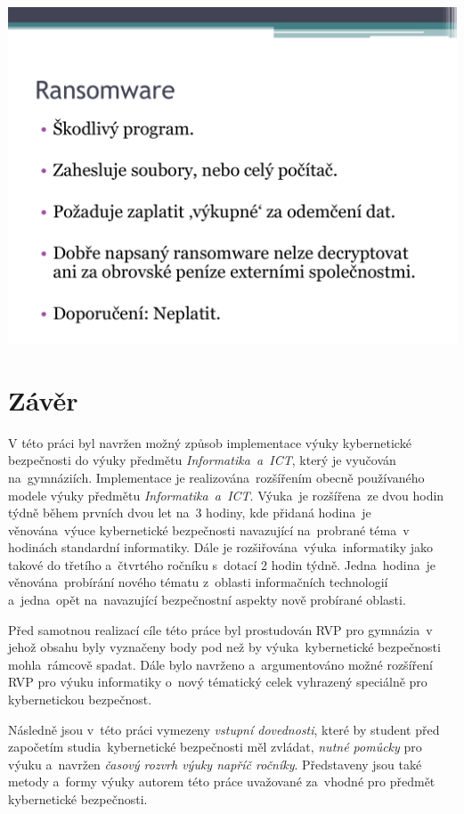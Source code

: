 \documentclass[a4paper, 12pt]{article}
\begin{document}
\vspace{0.5in}
\includegraphics[scale=0.5]{SecurityFlythroughSlides/p06.pdf} \\



\newpage
\section{Závěr}
V této práci byl navržen možný způsob implementace výuky kybernetické bezpečnosti do výuky předmětu \textit{Informatika~a~ICT}, který je vyučován na~gymnáziích. Implementace je realizována~rozšířením obecně používaného modele výuky předmětu \textit{Informatika~a~ICT}. Výuka~je rozšířena~ze dvou hodin týdně během prvních dvou let na~3 hodiny, kde přidaná hodina~je věnována~výuce kybernetické bezpečnosti navazující na~probrané téma~v hodinách standardní informatiky. Dále je rozšiřována~výuka~informatiky jako takové do třetího a~čtvrtého ročníku s~dotací 2 hodin týdně. Jedna~hodina~je věnována~probírání nového tématu z~oblasti informačních technologií a~jedna~opět na~navazující bezpečnostní aspekty nově probírané oblasti.

Před samotnou realizací cíle této práce byl prostudován RVP pro gymnázia~v jehož obsahu byly vyznačeny body pod než by výuka~kybernetické bezpečnosti mohla~rámcově spadat. Dále bylo navrženo a~argumentováno možné rozšíření RVP pro výuku informatiky o~nový tématický celek vyhrazený speciálně pro kybernetickou bezpečnost.

Následně jsou v~této práci vymezeny \textit{vstupní dovednosti}, které by student před započetím studia~kybernetické bezpečnosti měl zvládat, \textit{nutné pomůcky} pro výuku a~navržen \textit{časový rozvrh výuky napříč ročníky}. Představeny jsou také metody a~formy výuky autorem této práce uvažované za~vhodné pro předmět kybernetické bezpečnosti.
\end{document}
